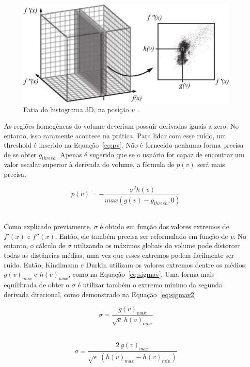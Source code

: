 \begin{figure}[h]
	\centering
	\includegraphics[width=1\textwidth]{images/g_hv}
	\caption{Fatia do histograma 3D, na posição $ v $~\cite{gordonms}.}
	\label{fig:g_hv}
\end{figure}

	As regiões homogêneas do volume deveriam possuir derivadas iguais a zero. No entanto, isso raramente acontece na prática. Para lidar com esse ruído, um threshold é inserido na Equação~\eqref{eq:pv}. Não é fornecido nenhuma forma precisa de se obter $ g_{thresh} $. Apenas é sugerido que se o usuário for capaz de encontrar um valor escalar superior à derivada  do volume, a fórmula de $ p(v) $ será mais precisa.

\begin{equation} \label{eq:pv}
	p(v) = -\frac{\sigma^{2}h(v)}{max(g(v) - g_{thresh}, 0)}
\end{equation} \

	Como explicado previamente, $\sigma$ é obtido em função dos valores extremos de $f'(x)$ e $f''(x)$. Então, ele também precisa ser reformulado em função de $v$. No entanto, o cálculo de $\sigma$ utilizando os máximos globais do volume pode distorcer todas as distâncias médias, uma vez que esses extremos podem facilmente ser ruído. Então, Kindlmann e Durkin utilizam os valores extremos dentre os médios: $g(v)_{max}$ e $h(v)_{max}$, como na Equação~\eqref{eq:sigmav}. Uma forma mais equilibrada de obter o $\sigma$ é utilizar também o extremo mínimo da segunda derivada direcional, como demonstrado na Equação~\eqref{eq:sigmav2}.
	
\begin{equation} \label{eq:sigmav}
	\sigma = \frac{g(v)_{max}}{\sqrt{e}\ h(v)_{max}}
\end{equation} \

\begin{equation} \label{eq:sigmav2}
	\sigma = \frac{2\ g(v)_{max}}{\sqrt{e}\ (h(v)_{max} - h(v)_{min})}
\end{equation} \

